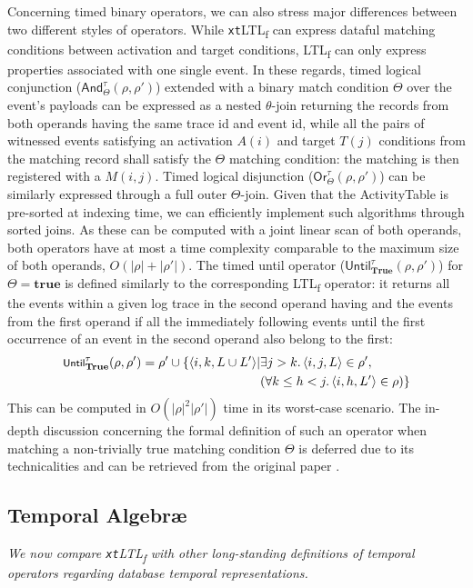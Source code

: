 \documentclass[sigconf]{acmart}
\begin{document}
Concerning timed binary operators, we can also stress major differences between two different styles of operators. While \texttt{xt}LTL\textsubscript{f} can  express dataful matching conditions between activation and target conditions,  LTL\textsubscript{f} can only express properties associated with one single event.
In these regards, timed logical conjunction ($\textsf{And}^\tau_\Theta(\rho,\rho')$) extended with a binary match condition $\Theta$ over the event's payloads can be expressed as a nested $\theta$-join returning the records from both operands having the same trace id and event id, while all the pairs of witnessed events satisfying an activation $A(i)$ and target $T(j)$ conditions from the matching record shall satisfy the $\Theta$ matching condition: the matching is then registered with a $M(i,j)$. Timed logical disjunction ($\textsf{Or}^\tau_\Theta(\rho,\rho')$) can be similarly expressed through a full outer $\Theta$-join. Given that the ActivityTable is pre-sorted at indexing time, we can efficiently implement such algorithms through sorted joins. As these can be computed with a joint linear scan of both operands, both operators have at most a time complexity comparable to the maximum size of both operands, $O(|\rho|+|\rho'|)$. The timed until operator ($\textsf{Until}^\tau_{\textbf{True}}(\rho,\rho')$) for $\Theta=\textbf{true}$ is defined similarly to the corresponding LTL\textsubscript{f} operator: it returns all the events within a given log trace in the second operand having and the events from the first operand if all the immediately following events until the first occurrence of an event in the second operand also belong to the first:
		\[\begin{split}
\footnotesize 			\textsf{Until}^\tau_\textbf{True}(\rho,\rho')=\rho'\cup \{\footnotesize\langle i,k,L\cup L'\rangle |&\exists j>k. \braket{i,j,L}\in\rho', \\
&(\forall k\leq h<j. \braket{i,h,L'}\in\rho) \}
\end{split}\]
This can be computed in $O(|\rho|^2|\rho'|)$ time in its worst-case scenario.
 The in-depth discussion concerning the formal definition of such an operator when matching a non-trivially true matching condition $\Theta$ is deferred due to its technicalities and can be retrieved from the original paper \cite{info14030173}.
\bigskip

\subsection{Temporal Algebr\ae}\label{timecompl}
\textit{We now compare \texttt{xt}LTL\textsubscript{f} with other long-standing definitions of temporal operators regarding database temporal representations.} 
\end{document}
